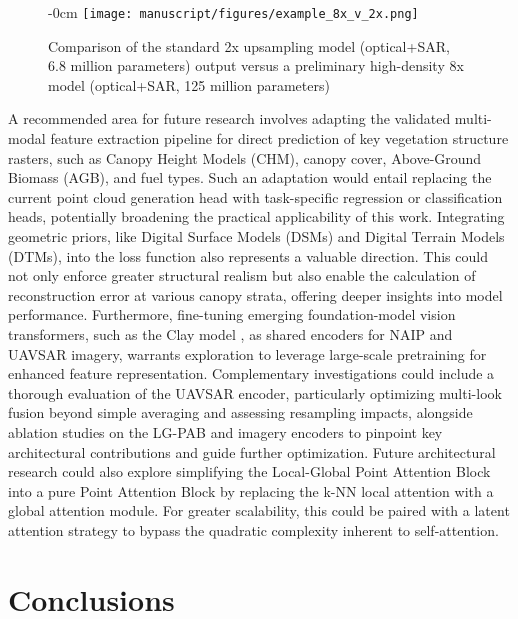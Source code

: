 \documentclass[remotesensing,article,submit,pdftex,moreauthors]{Definitions/mdpi}
\newenvironment{widefigure}[1][]{%
  \begin{figure}[#1]\begin{adjustwidth}{-\extralength}{0cm}\centering}{%
  \end{adjustwidth}\end{figure}}
\begin{document}
\begin{widefigure}[!b]
    \vspace{-10pt}
    \centering
    \texttt{[image: manuscript/figures/example\_8x\_v\_2x.png]}
    \caption{Comparison of the standard 2x upsampling model (optical+SAR, 6.8 million parameters) output versus a preliminary high-density 8x model (optical+SAR, 125 million parameters)}
    \label{fig:upsampling_comparison_8x}
\end{widefigure}

A recommended area for future research involves adapting the validated multi-modal feature extraction pipeline for direct prediction of key vegetation structure rasters, such as Canopy Height Models (CHM), canopy cover, Above-Ground Biomass (AGB), and fuel types. Such an adaptation would entail replacing the current point cloud generation head with task-specific regression or classification heads, potentially broadening the practical applicability of this work. Integrating geometric priors, like Digital Surface Models (DSMs) and Digital Terrain Models (DTMs), into the loss function also represents a valuable direction. This could not only enforce greater structural realism but also enable the calculation of reconstruction error at various canopy strata, offering deeper insights into model performance. Furthermore, fine-tuning emerging foundation-model vision transformers, such as the Clay model \cite{clay_model_v1p5}, as shared encoders for NAIP and UAVSAR imagery, warrants exploration to leverage large-scale pretraining for enhanced feature representation. Complementary investigations could include a thorough evaluation of the UAVSAR encoder, particularly optimizing multi-look fusion beyond simple averaging and assessing resampling impacts, alongside ablation studies on the LG-PAB and imagery encoders to pinpoint key architectural contributions and guide further optimization. Future architectural research could also explore simplifying the Local-Global Point Attention Block into a pure Point Attention Block by replacing the k-NN local attention with a global attention module. For greater scalability, this could be paired with a latent attention strategy \cite{liu2024deepseek} to bypass the quadratic complexity inherent to self-attention.


\section{Conclusions}
\end{document}
